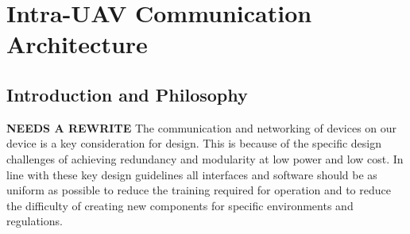 \newpage
{}
\section{Intra-UAV Communication Architecture} \label{Intra Communication}

\subsection{Introduction and Philosophy}
\textbf{NEEDS A REWRITE}
The communication and networking of devices on our device is a key consideration for design. This is because of the specific design challenges of achieving redundancy and modularity at low power and low cost. In line with these key design guidelines all interfaces and software should be as uniform as possible to reduce the training required for operation and to reduce the difficulty of creating new components for specific environments and regulations.


